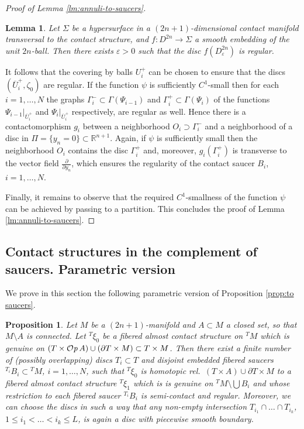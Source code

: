 \documentclass[12pt]{paper}
\theoremstyle{plain}
\newtheorem{proposition}[theorem]{Proposition}
\newtheorem{lemma}[theorem]{Lemma}
\theoremstyle{definition}
\newcommand{\ol}{\overline}
\newcommand{\p}{\partial}
\newcommand{\eps}{\varepsilon}
\newcommand{\R}{{\mathbb{R}}}
\def\Op{{\mathcal O}{\it p}\,}
\numberwithin{figure}{section}
\begin{document}
\begin{proof}[Proof of Lemma \ref{lm:annuli-to-saucers}]
 \begin{lemma}\label{lm:foliation}
 Let $\Sigma$  be a  hypersurface in a $(2n+1)$-dimensional contact manifold transversal to the contact structure, and $f:D^{2n}\to \Sigma$ a smooth embedding of the unit $2n$-ball. Then there exists $\eps>0$ such that the   disc $f(D_\eps^{2n}) $
 is  regular. 
\end{lemma}
 
 It follows that the covering by balls $U_i^+$ can be chosen to ensure   that the  discs $(\overline{U}^+_i, \zeta_0)$ are regular.
 If the function  $ \psi$ is  sufficiently $C^1$-small then    for each  $i=1,\dots, N$ the graphs $\Gamma^-_i \subset \Gamma(\Psi_{i-1})$ and $\Gamma^+_i \subset \Gamma(\Psi_i)$ of the functions $\Psi_{i-1}|_{\ol U_i^+}$ and $\Psi_{i}|_{\ol U_i^+}$ respectively, are regular as well.
Hence there is a  contactomorphism $g_i$ between a neighborhood    $O_i\supset\Gamma_i^-$  and a neighborhood of a disc in $\Pi=\{y_n=0\}\subset\R^{n+1}$.
Again, if $ \psi$   is  sufficiently small then  the neighborhood $O_i$ contains the disc $\Gamma_i^+$ and, moreover, $g_i(\Gamma^+_i)$ is transverse to the vector field $\frac\p{\p y_n}$, which ensures the regularity of the contact saucer $B_i$, $i=1,\dots, N$.

  Finally, it remains to observe that the required $C^1$-smallness  of the function  $ \psi$  can be achieved by passing to a partition. This concludes the proof of Lemma \ref{lm:annuli-to-saucers}. 
 \end{proof}  

\subsection{Contact structures in the complement of saucers. Parametric version} \label{saucers-param}
We prove in this section the following parametric version of Proposition
 \ref{prop:to saucers}.
  \begin{proposition}\label{prop:to-saucers-param}
 Let $ M$ be a $(2n+1)$-manifold and $A\subset M$ a closed set, so that  $M\setminus A$ is connected. Let ${}^T\xi_0$ be a fibered almost contact structure on ${}^TM$ which is genuine on $(T\times\Op A)\cup (\p T\times  M)\subset T\times M$. Then there exist a finite number of (possibly overlapping) discs $T_i\subset T$ and disjoint embedded fibered saucers ${}^{T_i}B_i\subset {}^TM$, $i=1,\dots, N$,
 such that  ${}^T\xi_0$ is homotopic rel.\ $(T\times A)\cup \p T\times M $ to a fibered almost contact structure ${}^T\xi_1$ which is is genuine on ${}^TM\setminus\bigcup B_i$ and whose restriction to each fibered saucer ${}^{T_i}B_i$ is semi-contact and regular.  
 Moreover, we can choose the discs in such a way that any non-empty intersection $T_{i_1}\cap\dots\cap T_{i_k}$, $1\leq i_1<\dots<i_k\leq L$, is again a disc with piecewise smooth boundary.
 \end{proposition}
 
\end{document}
